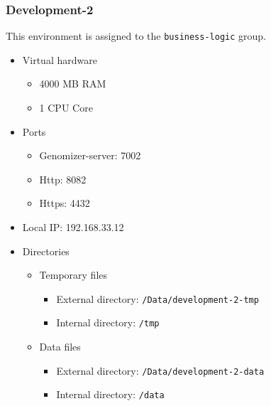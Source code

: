 \subsubsection{Development-2}\label{development-2}

This environment is assigned to the \texttt{business-logic} group.

\begin{itemize}
\itemsep1pt\parskip0pt
\item
  Virtual hardware

  \begin{itemize}
  \itemsep1pt\parskip0pt
  \item
    4000 MB RAM
  \item
    1 CPU Core
  \end{itemize}
\item
  Ports

  \begin{itemize}
  \itemsep1pt\parskip0pt
  \item
    Genomizer-server: 7002
  \item
    Http: 8082
  \item
    Https: 4432
  \end{itemize}
\item
  Local IP: 192.168.33.12
\item
  Directories

  \begin{itemize}
  \itemsep1pt\parskip0pt
  \item
    Temporary files

    \begin{itemize}
    \itemsep1pt\parskip0pt
    \item
      External directory: \texttt{/Data/development-2-tmp}
    \item
      Internal directory: \texttt{/tmp}
    \end{itemize}
  \item
    Data files

    \begin{itemize}
    \itemsep1pt\parskip0pt
    \item
      External directory: \texttt{/Data/development-2-data}
    \item
      Internal directory: \texttt{/data}
    \end{itemize}
  \end{itemize}
\end{itemize}

